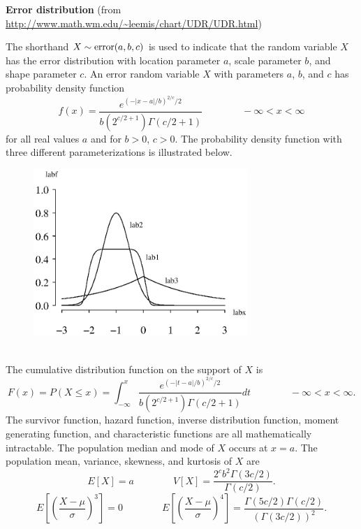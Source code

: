 \documentclass[12pt,fullpage]{article}
\begin{document}
\noindent
{\bf Error distribution} (from \color{blue}\url{http://www.math.wm.edu/~leemis/chart/UDR/UDR.html}\color{black})

\noindent
The shorthand $X \sim {\rm error}(a, b, c)$ is used to indicate that the
random variable $X$ has the error distribution with location parameter $a$, scale parameter $b$, and shape parameter $c$.
An error random variable $X$ with parameters $a$, $b$, and $c$ has probability density function 
$$
f(x) = \frac{{e^{\left( -{\left| x-a \right|/b} \right) ^{2/c}/2}}}{b({2}^{c/2+1}) \Gamma  \left( c/2+1 \right)} \qquad \qquad -\infty < x < \infty
$$
for all real values $a$ and for $ b > 0$, $c > 0$.
The probability density function with three different parameterizations is illustrated below.
{\begin{figure}[h!]
\begin{center}
\includegraphics[width=3.2in]{ErrorPlot.ps}
\end{center}
\end{figure}}\\
The cumulative distribution function on the support of $X$ is
$$
F(x) = P(X \le x) = \int_{-\infty}^x\frac{{e^{\left( -\left| t-a \right|/b \right) 
^{2/c}/2}}}{b({2}^{c/2+1}) \Gamma  \left( c/2+1 \right)}dt \qquad \qquad -\infty < x < \infty.
$$
The survivor function, hazard function, inverse distribution function, moment generating function, 
and characteristic functions are all mathematically intractable.
The population median and mode of $X$ occurs at $x = a$.
The population mean, variance, skewness, and kurtosis of $X$ are 
$$
E[X] = a \qquad \qquad V[X] = \frac{2 ^ c b ^ 2 \Gamma(3c / 2)}{\Gamma(c/2)}.
$$
$$
E\left[ \left( \frac{X - \mu}{\sigma} \right) ^ 3 \right] = 0 \qquad \qquad
E\left[ \left( \frac{X - \mu}{\sigma} \right) ^ 4 \right] = \frac{\Gamma(5c / 2) \Gamma(c / 2)}{(\Gamma(3c/2)) ^ 2}.
$$
%
%
\end{document}
